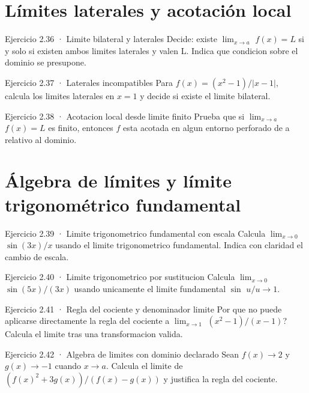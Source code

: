 \documentclass[10pt,a4paper,oneside,openany]{book}
\begin{document}
\section{Límites laterales y acotación local}
\begin{PSevenExerciseFixed}{Ejercicio 2.36 · Limite bilateral y laterales}
Decide: existe \(\lim_{x\to a}\) \(f(x)=L\) si y solo si existen ambos limites laterales y valen L. Indica que condicion sobre el dominio se presupone.
\end{PSevenExerciseFixed}
\begin{PSevenExerciseFixed}{Ejercicio 2.37 · Laterales incompatibles}
Para \(f(x)=(x^{2}-1)/|x-1|,\) calcula los limites laterales en \(x=1\) y decide si existe el limite bilateral.
\end{PSevenExerciseFixed}
\begin{PSevenExerciseFixed}{Ejercicio 2.38 · Acotacion local desde limite finito}
Prueba que si \(\lim_{x\to a}\) \(f(x)=L\) es finito, entonces \(f\) esta acotada en algun entorno perforado de a relativo al dominio.
\end{PSevenExerciseFixed}
\section{Álgebra de límites y límite trigonométrico fundamental}
\begin{PSevenExerciseFixed}{Ejercicio 2.39 · Limite trigonometrico fundamental con escala}
Calcula \(\lim_{x\to 0}\) \(\sin(3x)/x\) usando el limite trigonometrico fundamental. Indica con claridad el cambio de escala.
\end{PSevenExerciseFixed}
\begin{PSevenExerciseFixed}{Ejercicio 2.40 · Limite trigonometrico por sustitucion}
Calcula \(\lim_{x\to 0}\) \(\sin(5x)/(3x)\) usando unicamente el limite fundamental \(\sin\) \(u/u\to 1\).
\end{PSevenExerciseFixed}
\begin{PSevenExerciseFixed}{Ejercicio 2.41 · Regla del cociente y denominador limite}
Por que no puede aplicarse directamente la regla del cociente a \(\lim_{x\to 1}\) \((x^{2}-1)/(x-1)\)? Calcula el limite tras una transformacion valida.
\end{PSevenExerciseFixed}
\begin{PSevenExerciseFixed}{Ejercicio 2.42 · Algebra de limites con dominio declarado}
Sean \(f(x)\to 2\) y \(g(x)\to -1\) cuando \(x\to a\). Calcula el limite de \((f(x)^{2}+3g(x))/(f(x)-g(x))\) y justifica la regla del cociente.
\end{PSevenExerciseFixed}
\end{document}
